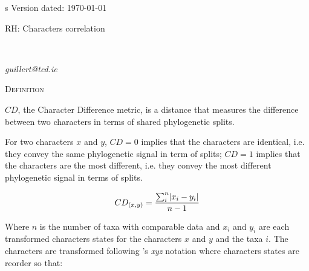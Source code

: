 \documentclass[12pt,letterpaper]{article}
\DeclarePairedDelimiter\abs{\lvert}{\rvert}%
\renewcommand{\section}[1]{%
\bigskip
\begin{center}
\begin{Large}
\normalfont\scshape #1
\medskip
\end{Large}
\end{center}}
\begin{document}
\begin{flushright}s
Version dated: \today
\end{flushright}

\bigskip
\noindent RH: Characters correlation
\bigskip
\medskip
\begin{center}
\bigskip

\\

\end{center}
\medskip
{} \textit{guillert@tcd.ie}\\ 
\vspace{1in}

\newpage

\section{Definition}

$CD$, the Character Difference metric, is a distance that measures the difference between two characters in terms of shared phylogenetic splits.

For two characters $x$ and $y$, $CD=0$ implies that the characters are identical, i.e. they convey the same phylogenetic signal in term of splits; $CD=1$ implies that the characters are the most different, i.e. they convey the most different phylogenetic signal in terms of splits.

\begin{equation}
    CD_{(x,y)} = \frac{\sum_{i}^{n}\abs{x_{i} - y_{i}}}{n-1}
\end{equation}

\noindent Where $n$ is the number of taxa with comparable data and $x_i$ and $y_i$ are each transformed characters states for the characters $x$ and $y$ and the taxa $i$.
The characters are transformed following \cite{felsenstein2004inferring}'s \textit{xyz} notation where characters states are reorder so that:
\end{document}
